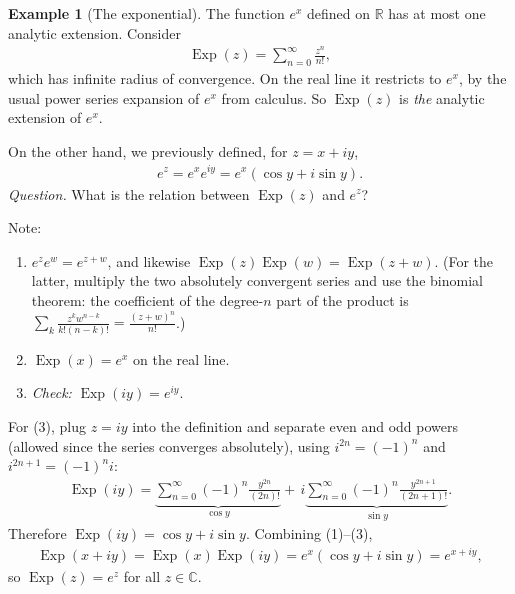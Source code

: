 \documentclass[11pt]{article}
\theoremstyle{plain}
\theoremstyle{definition}
\newtheorem{definition}[theorem]{Definition}
\newtheorem{example}[theorem]{Example}
\theoremstyle{remark}
\numberwithin{equation}{section}
\newcommand{\be}{\begin{eqnarray}}
\newcommand{\ee}{\end{eqnarray}}
\newcommand{\C}{\mathbb{C}}
\newcommand{\R}{\mathbb{R}}
\newcommand{\CT}{\C[[T]]}
\begin{document}
\begin{example}[The exponential]
\label{ex:exp}
The function $e^x$ defined on $\R$ has at most one analytic extension.
Consider
\be
 \operatorname{Exp}(z)=\sum_{n=0}^{\infty}\frac{z^n}{n!},
\ee
which has infinite radius of convergence. On the real line it restricts to
$e^x$, by the usual power series expansion of $e^x$ from calculus. So
$\operatorname{Exp}(z)$ is \emph{the} analytic extension of $e^x$.

On the other hand, we previously defined, for $z=x+iy$,
\be
 e^z=e^x e^{iy}=e^x(\cos y+i\sin y).
\ee
\emph{Question.} What is the relation between $\operatorname{Exp}(z)$ and
$e^z$?

Note:
\begin{enumerate}[label=(\arabic*)]
  \item $e^ze^w=e^{z+w}$, and likewise
  $\operatorname{Exp}(z)\operatorname{Exp}(w)=\operatorname{Exp}(z+w)$.
  (For the latter, multiply the two absolutely convergent series and use the
  binomial theorem: the coefficient of the degree-$n$ part of the product is
  $\sum_{k}\frac{z^kw^{n-k}}{k!(n-k)!}=\frac{(z+w)^n}{n!}$.)
  \item $\operatorname{Exp}(x)=e^x$ on the real line.
  \item \emph{Check:} $\operatorname{Exp}(iy)=e^{iy}$.
\end{enumerate}

For (3), plug $z=iy$ into the definition and separate even and odd powers
(allowed since the series converges absolutely), using $i^{2n}=(-1)^n$ and
$i^{2n+1}=(-1)^ni$:
\be
 \operatorname{Exp}(iy)
 =\underbrace{\sum_{n=0}^{\infty}(-1)^n\frac{y^{2n}}{(2n)!}}_{\cos y}
 +\,i\underbrace{\sum_{n=0}^{\infty}(-1)^n\frac{y^{2n+1}}{(2n+1)!}}_{\sin y}.
\ee
Therefore $\operatorname{Exp}(iy)=\cos y+i\sin y$. Combining (1)--(3),
\be
 \operatorname{Exp}(x+iy)=\operatorname{Exp}(x)\operatorname{Exp}(iy)
 =e^x(\cos y+i\sin y)=e^{x+iy},
\ee
so $\operatorname{Exp}(z)=e^z$ for all $z\in\C$.
\end{example}
%
\end{document}
